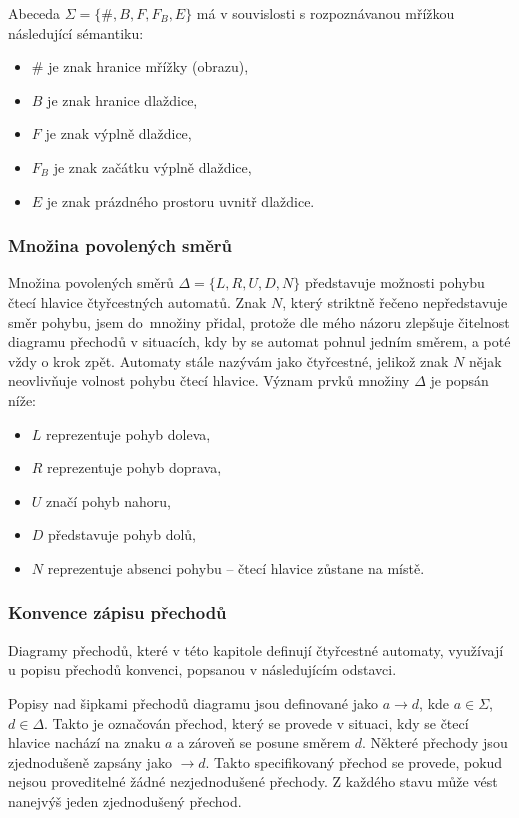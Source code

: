 Abeceda $\Sigma = \{\#, B, F, F_{B}, E\}$ má v souvislosti s rozpoznávanou mřížkou následující sémantiku:
\begin{itemize}
    \item $\#$ je znak hranice mřížky (obrazu),
    \item $B$ je znak hranice dlaždice,
    \item $F$ je znak výplně dlaždice,
    \item $F_{B}$ je znak začátku výplně dlaždice,
    \item $E$ je znak prázdného prostoru uvnitř dlaždice.
\end{itemize}

\subsubsection*{Množina povolených směrů}

Množina povolených směrů $\Delta = \{L, R, U, D, N\}$ představuje možnosti pohybu čtecí hlavice čtyřcestných automatů. Znak $N$, který striktně řečeno nepředstavuje směr pohybu, jsem do~množiny přidal, protože dle mého názoru zlepšuje čitelnost diagramu přechodů v situacích, kdy by se automat pohnul jedním směrem, a poté vždy o krok zpět. Automaty stále nazývám jako čtyřcestné, jelikož znak $N$ nějak neovlivňuje volnost pohybu čtecí hlavice. Význam prvků množiny $\Delta$ je popsán níže:

\begin{itemize}
    \item $L$ reprezentuje pohyb doleva,
    \item $R$ reprezentuje pohyb doprava,
    \item $U$ značí pohyb nahoru,
    \item $D$ představuje pohyb dolů,
    \item $N$ reprezentuje absenci pohybu -- čtecí hlavice zůstane na místě.
\end{itemize}

\subsubsection*{Konvence zápisu přechodů}

Diagramy přechodů, které v této kapitole definují čtyřcestné automaty, využívají u popisu přechodů konvenci, popsanou v následujícím odstavci.

Popisy nad šipkami přechodů diagramu jsou definované jako $a \rightarrow d$, kde $a \in \Sigma$,  $d \in \Delta$. Takto je označován přechod, který se provede v situaci, kdy se čtecí hlavice nachází na znaku $a$ a zároveň se posune směrem $d$. Některé přechody jsou zjednodušeně zapsány jako $\rightarrow d$. Takto specifikovaný přechod se provede, pokud nejsou proveditelné žádné nezjednodušené přechody. Z každého stavu může vést nanejvýš jeden zjednodušený přechod.

